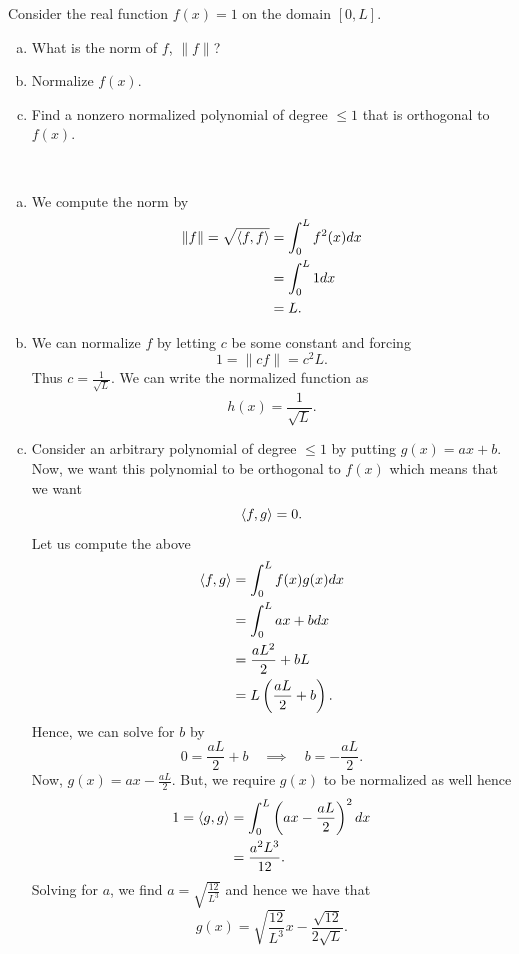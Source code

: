 \documentclass[12pt]{article} %
\begin{document}
\newpage
\begin{problem}
	Consider the real function $f(x)=1$ on the domain $[0,L]$.
	\begin{enumerate}[(a)]
		\item What is the norm of $f$, $\|f\|$?
		\item Normalize $f(x)$.
		\item Find a nonzero normalized polynomial of degree $\leq 1$ that is orthogonal to $f(x)$.
	\end{enumerate}
\end{problem}
\begin{solution}~
	\begin{enumerate}[(a)]
		\item We compute the norm by
		\begin{align*}
			\|f\| = \sqrt{\left\langle f, f \right\rangle} &= \int_0^L f^2(x)dx\\
			&= \int_0^L 1 dx\\
			&= L.
		\end{align*}
		\item We can normalize $f$ by letting $c$ be some constant and forcing
		\[
		1=\|cf\| = c^2L.
		\]
		Thus $c=\frac{1}{\sqrt{L}}$.  We can write the normalized function as
		\[
		h(x)=\frac{1}{\sqrt{L}}. 
		\]
		\item Consider an arbitrary polynomial of degree $\leq 1$ by putting $g(x)=ax+b$.  Now, we want this polynomial to be orthogonal to $f(x)$ which means that we want
		\[
		\left\langle f, g \right\rangle=0.
		\]
		Let us compute the above
		\begin{align*}
			\left\langle f, g \right\rangle &= \int_0^L f(x)g(x)dx\\
			&=\int_0^L ax+bdx\\
			&= \frac{aL^2}{2}+bL\\
			&= L\left(\frac{aL}{2}+b\right).
		\end{align*}
		Hence, we can solve for $b$ by
		\[
		0=\frac{aL}{2}+b \quad \implies \quad b= -\frac{aL}{2}.
		\]
		Now, $g(x)=ax-\frac{aL}{2}$.  But, we require $g(x)$ to be normalized as well hence
		\begin{align*}
			1=\left\langle g, g \right\rangle &= \int_0^L \left(ax-\frac{aL}{2}\right)^2dx\\
			&= \frac{a^2L^3}{12}.
		\end{align*}
		Solving for $a$, we find $a=\sqrt{\frac{12}{L^3}}$ and hence we have that
		\[
		g(x) = \sqrt{\frac{12}{L^3}} x - \frac{\sqrt{12}}{2\sqrt{L}}.
		\]
	\end{enumerate}
\end{solution}
\end{document}

